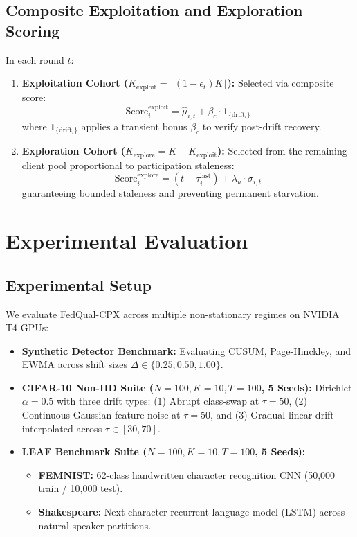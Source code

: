 \documentclass[journal,compsoc]{IEEEtran}
\begin{document}
\subsection{Composite Exploitation and Exploration Scoring}
In each round $t$:
\begin{enumerate}
    \item \textbf{Exploitation Cohort ($K_{\text{exploit}} = \lfloor (1 - \epsilon_t) K \rfloor$):} Selected via composite score:
    \begin{equation}
    \text{Score}_i^{\text{exploit}} = \hat{\mu}_{i,t} + \beta_c \cdot \mathbf{1}_{\{\text{drift}_i\}}
    \end{equation}
    where $\mathbf{1}_{\{\text{drift}_i\}}$ applies a transient bonus $\beta_c$ to verify post-drift recovery.
    \item \textbf{Exploration Cohort ($K_{\text{explore}} = K - K_{\text{exploit}}$):} Selected from the remaining client pool proportional to participation staleness:
    \begin{equation}
    \text{Score}_i^{\text{explore}} = (t - \tau_i^{\text{last}}) + \lambda_u \cdot \sigma_{i,t}
    \end{equation}
    guaranteeing bounded staleness and preventing permanent starvation.
\end{enumerate}

\section{Experimental Evaluation}

\subsection{Experimental Setup}
We evaluate FedQual-CPX across multiple non-stationary regimes on NVIDIA T4 GPUs:
\begin{itemize}
    \item \textbf{Synthetic Detector Benchmark:} Evaluating CUSUM, Page-Hinckley, and EWMA across shift sizes $\Delta \in \{0.25, 0.50, 1.00\}$.
    \item \textbf{CIFAR-10 Non-IID Suite ($N=100, K=10, T=100$, 5 Seeds):} Dirichlet $\alpha=0.5$ with three drift types: (1) Abrupt class-swap at $\tau=50$, (2) Continuous Gaussian feature noise at $\tau=50$, and (3) Gradual linear drift interpolated across $\tau \in [30, 70]$.
    \item \textbf{LEAF Benchmark Suite ($N=100, K=10, T=100$, 5 Seeds):}
    \begin{itemize}
        \item \textbf{FEMNIST:} 62-class handwritten character recognition CNN (50,000 train / 10,000 test).
        \item \textbf{Shakespeare:} Next-character recurrent language model (LSTM) across natural speaker partitions.
    \end{itemize}
\end{itemize}
\end{document}
